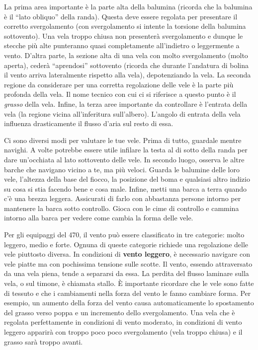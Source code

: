 La prima area importante è la parte alta della balumina (ricorda che la balumina
è il ``lato obliquo'' della randa). Questa deve essere
regolata per presentare il corretto svergolamento (con svergolamento si intente
la torsione della balumina sottovento). Una vela
troppo chiusa non presenterà svergolamento e dunque le stecche più alte punteranno quasi
completamente all'indietro o leggermente a vento. D'altra parte, la sezione alta di una vela con
molto svergolamento (molto aperta), cederà ``aprendosi'' sottovento (ricorda che
durante l'andatura di bolina il vento arriva lateralmente rispetto alla vela),
depotenziando la vela.
%
La seconda regione da considerare per una corretta regolazione delle vele è la
parte più profonda della vela. Il nome tecnico con cui ci si riferisce a questo
punto è il \emph{grasso} della vela.
%
Infine, la terza aree importante da controllare è l'entrata della vela (la
regione vicina all'inferitura sull'albero). L'angolo di entrata della vela
influenza drasticamente il flusso d'aria sul resto di essa.

Ci sono diversi modi per valutare le tue vele. Prima di tutto, guardale
mentre navighi. A volte potrebbe essere utile infilare la testa al di sotto della randa
per dare un'occhiata al lato sottovento delle vele. In secondo luogo, osserva le
altre barche che navigano vicino a te, ma più veloci. Guarda le balumine delle
loro vele, l'altezza della base del fiocco, la posizione del boma
e qualsiasi altro indizio su cosa si stia facendo bene e cosa male. Infine,
metti una barca a terra quando c'è una brezza leggera. Assicurati di farlo con
abbastanza persone intorno per mantenere la barca sotto controllo. Gioca con le
cime di controllo e cammina intorno alla barca per vedere come cambia la forma
delle vele.

Per gli equipaggi del 470, il vento può essere classificato in tre categorie:
molto leggero, medio e forte. Ognuna di queste categorie richiede una
regolazione delle vele piuttosto diversa. In condizioni di \textbf{vento leggero}, è
necessario navigare con vele piatte ma con pochissima tensione sulle scotte. Il
vento, essendo attraversato da una vela piena, tende a separarsi da essa. La
perdita del flusso laminare sulla vela, o sul timone, è chiamata stallo. È
importante ricordare che le vele sono fatte di tessuto e che i cambiamenti nella
forza del vento le fanno cambiare forma. Per esempio, un aumento della forza del
vento causa automaticamente lo spostamento del grasso verso poppa e un
incremento dello svergolamento. Una vela che è regolata perfettamente in
condizioni di vento moderato, in condizioni di vento leggero apparirà con troppo
poco poco svergolamento (vela troppo chiusa) e il grasso
sarà troppo avanti.

